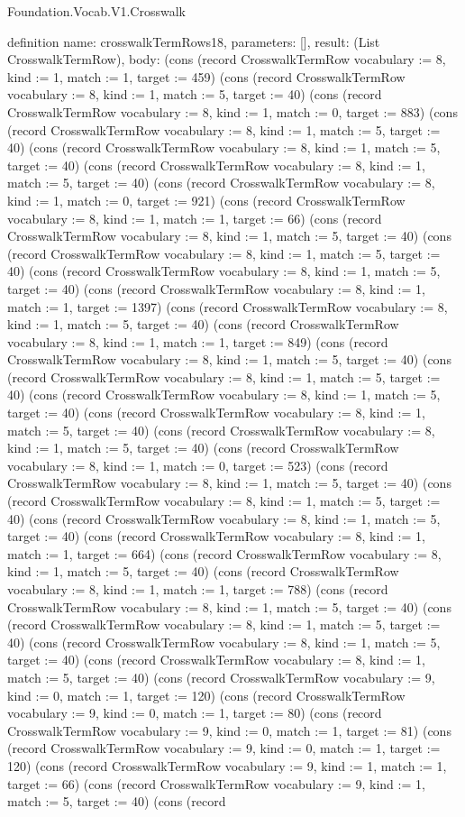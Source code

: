 \begin{lexlean}{Foundation.Vocab.V1.Crosswalk}
\begin{semanticmodule}
definition{
  name: crosswalkTermRows18,
  parameters: [],
  result: (List CrosswalkTermRow),
  body: (cons (record CrosswalkTermRow {vocabulary := 8, kind := 1, match := 1, target := 459}) (cons (record CrosswalkTermRow {vocabulary := 8, kind := 1, match := 5, target := 40}) (cons (record CrosswalkTermRow {vocabulary := 8, kind := 1, match := 0, target := 883}) (cons (record CrosswalkTermRow {vocabulary := 8, kind := 1, match := 5, target := 40}) (cons (record CrosswalkTermRow {vocabulary := 8, kind := 1, match := 5, target := 40}) (cons (record CrosswalkTermRow {vocabulary := 8, kind := 1, match := 5, target := 40}) (cons (record CrosswalkTermRow {vocabulary := 8, kind := 1, match := 0, target := 921}) (cons (record CrosswalkTermRow {vocabulary := 8, kind := 1, match := 1, target := 66}) (cons (record CrosswalkTermRow {vocabulary := 8, kind := 1, match := 5, target := 40}) (cons (record CrosswalkTermRow {vocabulary := 8, kind := 1, match := 5, target := 40}) (cons (record CrosswalkTermRow {vocabulary := 8, kind := 1, match := 5, target := 40}) (cons (record CrosswalkTermRow {vocabulary := 8, kind := 1, match := 1, target := 1397}) (cons (record CrosswalkTermRow {vocabulary := 8, kind := 1, match := 5, target := 40}) (cons (record CrosswalkTermRow {vocabulary := 8, kind := 1, match := 1, target := 849}) (cons (record CrosswalkTermRow {vocabulary := 8, kind := 1, match := 5, target := 40}) (cons (record CrosswalkTermRow {vocabulary := 8, kind := 1, match := 5, target := 40}) (cons (record CrosswalkTermRow {vocabulary := 8, kind := 1, match := 5, target := 40}) (cons (record CrosswalkTermRow {vocabulary := 8, kind := 1, match := 5, target := 40}) (cons (record CrosswalkTermRow {vocabulary := 8, kind := 1, match := 5, target := 40}) (cons (record CrosswalkTermRow {vocabulary := 8, kind := 1, match := 0, target := 523}) (cons (record CrosswalkTermRow {vocabulary := 8, kind := 1, match := 5, target := 40}) (cons (record CrosswalkTermRow {vocabulary := 8, kind := 1, match := 5, target := 40}) (cons (record CrosswalkTermRow {vocabulary := 8, kind := 1, match := 5, target := 40}) (cons (record CrosswalkTermRow {vocabulary := 8, kind := 1, match := 1, target := 664}) (cons (record CrosswalkTermRow {vocabulary := 8, kind := 1, match := 5, target := 40}) (cons (record CrosswalkTermRow {vocabulary := 8, kind := 1, match := 1, target := 788}) (cons (record CrosswalkTermRow {vocabulary := 8, kind := 1, match := 5, target := 40}) (cons (record CrosswalkTermRow {vocabulary := 8, kind := 1, match := 5, target := 40}) (cons (record CrosswalkTermRow {vocabulary := 8, kind := 1, match := 5, target := 40}) (cons (record CrosswalkTermRow {vocabulary := 8, kind := 1, match := 5, target := 40}) (cons (record CrosswalkTermRow {vocabulary := 9, kind := 0, match := 1, target := 120}) (cons (record CrosswalkTermRow {vocabulary := 9, kind := 0, match := 1, target := 80}) (cons (record CrosswalkTermRow {vocabulary := 9, kind := 0, match := 1, target := 81}) (cons (record CrosswalkTermRow {vocabulary := 9, kind := 0, match := 1, target := 120}) (cons (record CrosswalkTermRow {vocabulary := 9, kind := 1, match := 1, target := 66}) (cons (record CrosswalkTermRow {vocabulary := 9, kind := 1, match := 5, target := 40}) (cons (record }
\end{semanticmodule}
\end{lexlean}
